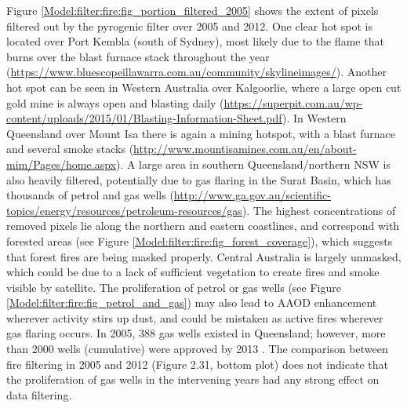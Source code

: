     
    
    Figure \ref{Model:filter:fire:fig_portion_filtered_2005} shows the extent of pixels filtered out by the pyrogenic filter over 2005 and 2012.
    One clear hot spot is located over Port Kembla (south of Sydney), most likely due to the flame that burns over the blast furnace stack throughout the year (\url{https://www.bluescopeillawarra.com.au/community/skylineimages/}).
    Another hot spot can be seen in Western Australia over Kalgoorlie, where a large open cut gold mine is always open and blasting daily (\url{https://superpit.com.au/wp-content/uploads/2015/01/Blasting-Information-Sheet.pdf}).
    In Western Queensland over Mount Isa there is again a mining hotspot, with a blast furnace and several smoke stacks (\url{http://www.mountisamines.com.au/en/about-mim/Pages/home.aspx}).
    A large area in southern Queensland/northern NSW is also heavily filtered, potentially due to gas flaring in the Surat Basin, which has thousands of petrol and gas wells (\url{http://www.ga.gov.au/scientific-topics/energy/resources/petroleum-resources/gas}).
    The highest concentrations of removed pixels lie along the northern and eastern coastlines, and correspond with forested areas (see Figure \ref{Model:filter:fire:fig_forest_coverage}), which suggests that forest fires are being masked properly.
    Central Australia is largely unmasked, which could be due to a lack of sufficient vegetation to create fires and smoke visible by satellite.
    The proliferation of petrol or gas wells (see Figure \ref{Model:filter:fire:fig_petrol_and_gas}) may also lead to AAOD enhancement wherever activity stirs up dust, and could be mistaken as active fires wherever gas flaring occurs.
    In 2005, 388 gas wells existed in Queensland; however, more than 2000 wells (cumulative) were approved by 2013 \parencite{Carlisle2012}.
    The comparison between fire filtering in 2005 and 2012 (Figure 2.31, bottom plot) does not indicate that the proliferation of gas wells in the intervening years had any strong effect on data filtering. 
    
